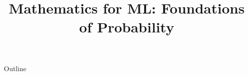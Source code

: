 \documentclass[xcolor=dvipsnames,compress,t,pdf,9pt]{beamer}
\title[\insertframenumber /\inserttotalframenumber]{Mathematics for ML: Foundations of Probability}
\begin{document}
	\begin{frame}
	\titlepage
	\end{frame}

	\begin{frame}{Outline}
	    \tableofcontents
	\end{frame}

	
	
	
	
\end{document}
